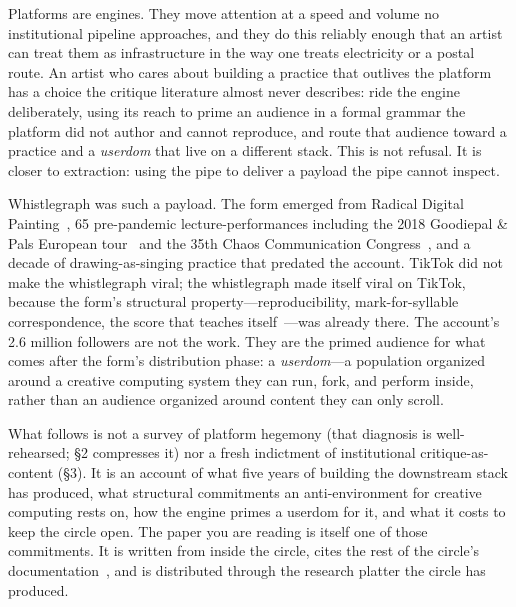 \documentclass[10pt,letterpaper,twocolumn]{article}
\begin{document}
Platforms are engines. They move attention at a speed and volume no institutional pipeline approaches, and they do this reliably enough that an artist can treat them as infrastructure in the way one treats electricity or a postal route. An artist who cares about building a practice that outlives the platform has a choice the critique literature almost never describes: ride the engine deliberately, using its reach to prime an audience in a formal grammar the platform did not author and cannot reproduce, and route that audience toward a practice and a \emph{userdom} that live on a different stack. This is not refusal. It is closer to extraction: using the pipe to deliver a payload the pipe cannot inspect.

Whistlegraph was such a payload. The form emerged from Radical Digital Painting~\citep{scudder2017manifesto}, 65 pre-pandemic lecture-performances including the 2018 Goodiepal \& Pals European tour~\citep{scudder2026goodiepal} and the 35th Chaos Communication Congress~\citep{scudder2018rdp35c3}, and a decade of drawing-as-singing practice that predated the account. TikTok did not make the whistlegraph viral; the whistlegraph made itself viral on TikTok, because the form's structural property---reproducibility, mark-for-syllable correspondence, the score that teaches itself~\citep{scudder2026whistlegraph}---was already there. The account's 2.6 million followers are not the work. They are the primed audience for what comes after the form's distribution phase: a \emph{userdom}---a population organized around a creative computing system they can run, fork, and perform inside, rather than an audience organized around content they can only scroll.

What follows is not a survey of platform hegemony (that diagnosis is well-rehearsed; \S2 compresses it) nor a fresh indictment of institutional critique-as-content (\S3). It is an account of what five years of building the downstream stack has produced, what structural commitments an anti-environment for creative computing rests on, how the engine primes a userdom for it, and what it costs to keep the circle open. The paper you are reading is itself one of those commitments. It is written from inside the circle, cites the rest of the circle's documentation~\citep{scudder2026ac, scudder2026kidlisp, scudder2026notepat, scudder2026os, scudder2026pieces, scudder2026urltradition, scudder2026archaeology, scudder2026whistlegraph, scudder2026goodiepal}, and is distributed through the research platter the circle has produced.
\end{document}
